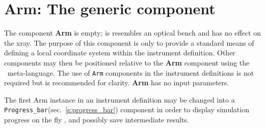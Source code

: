 \section{Arm: The generic component}
\label{s:arm}


The component \textbf{Arm} is empty; is resembles an optical bench
and has no effect on the xray.
The purpose of this component is only to provide a standard
means of defining a local coordinate system within the instrument definition.
Other components may then be
positioned relative to the \textbf{Arm} component
using the \MCX\ meta-language.
The use of \texttt{Arm} components in the instrument definitions
is not required but is recommended for clarity.
\textbf{Arm} has no input parameters.

The first Arm instance in an instrument definition may be changed into a
\verb+Progress_bar+(sec.~\ref{s:progress_bar}) component in order to display
simulation progress on the fly , and possibly save intermediate results.
